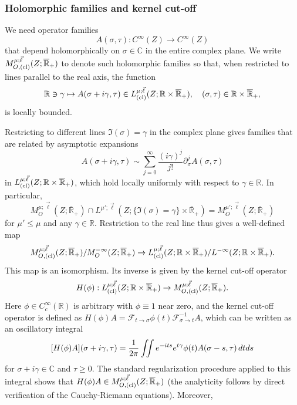 \documentclass[reqno]{amsart}
\numberwithin{equation}{section}
\theoremstyle{definition}
\def\C{\mathbb C}
\def\R{\mathbb R}
\begin{document}
\subsubsection*{Holomorphic families and kernel cut-off}

We need operator families
$$
A(\sigma,\tau) : C^{\infty}(Z) \to C^{\infty}(Z)
$$
that depend holomorphically on $\sigma \in \C$ in the entire complex plane. We write $M_{O,\textup{(cl)}}^{\mu;\vec{\ell}}(Z;\overline{\R}_+)$ to denote such holomorphic families so that, when restricted to lines parallel to the real axis, the function
$$
\R \ni \gamma \mapsto A(\sigma + i\gamma,\tau) \in L_{\textup{(cl)}}^{\mu;\vec{\ell}}(Z;\R\times\overline{\R}_+), \quad (\sigma,\tau) \in \R\times\overline{\R}_+,
$$
is locally bounded.

Restricting to different lines $\Im(\sigma) = \gamma$ in the complex plane gives families that are related by asymptotic expansions
$$
A(\sigma+i\gamma,\tau) \sim \sum\limits_{j=0}^{\infty}\frac{(i\gamma)^j}{j!}\partial^j_\sigma A(\sigma,\tau)
$$
in $L_{\textup{(cl)}}^{\mu;\vec{\ell}}(Z;\R\times\overline{\R}_+)$, which hold locally uniformly with respect to $\gamma \in \R$. In particular,
$$
M_{O}^{\mu;\vec{\ell}}(Z;\overline{\R}_+)\cap L^{\mu';\vec{\ell}}(Z;\{\Im(\sigma)=\gamma\}\times\overline{\R}_+) = M_{O}^{\mu';\vec{\ell}}(Z;\overline{\R}_+)
$$
for $\mu' \leq \mu$ and any $\gamma \in \R$. Restriction to the real line thus gives a well-defined map
$$
M_{O,\textup{(cl)}}^{\mu;\vec{\ell}}(Z;\overline{\R}_+)/M_{O}^{-\infty}(Z;\overline{\R}_+) \to L_{\textup{(cl)}}^{\mu;\vec{\ell}}(Z;\R\times\overline{\R}_+)/L^{-\infty}(Z;\R\times\overline{\R}_+).
$$
This map is an isomorphism. Its inverse is given by the kernel cut-off operator
\begin{equation}\label{HphiSpaces}
H(\phi) : L_{\textup{(cl)}}^{\mu;\vec{\ell}}(Z;\R\times\overline{\R}_+) \to M_{O,\textup{(cl)}}^{\mu;\vec{\ell}}(Z;\overline{\R}_+).
\end{equation}
Here $\phi \in C_c^{\infty}(\R)$ is arbitrary with $\phi \equiv 1$ near zero, and the kernel cut-off operator is defined as $H(\phi)A = {\mathcal F}_{t \to \sigma}\phi(t){\mathcal F}^{-1}_{\sigma \to t}A$, which can be written as an oscillatory integral
\begin{equation}\label{kernelcutoff}
[H(\phi)A](\sigma+i\gamma,\tau) = \frac{1}{2\pi} \iint e^{-its}e^{t\gamma}\phi(t)A(\sigma-s,\tau)\,dt ds \\
\end{equation}
for $\sigma + i\gamma \in \C$ and $\tau \geq 0$. The standard regularization procedure applied to this integral shows that $H(\phi)A \in M_{O,\textup{(cl)}}^{\mu;\vec{\ell}}(Z;\overline{\R}_+)$ (the analyticity follows by direct verification of the Cauchy-Riemann equations). Moreover,
\end{document}
